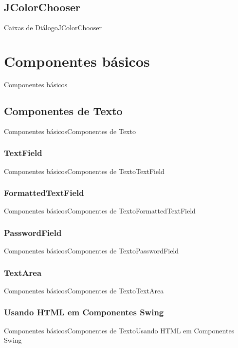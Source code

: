 \documentclass[10pt]{beamer}
\begin{document}
\subsection{JColorChooser}
\begin{frame}{Caixas de Diálogo}{JColorChooser}
\end{frame}{}
\section{Componentes básicos}
\begin{frame}{Componentes básicos}{}
\end{frame}{}
\subsection{Componentes de Texto}
\begin{frame}{Componentes básicos}{Componentes de Texto}
\end{frame}{}
\subsubsection{TextField}
\begin{frame}{Componentes básicos}{Componentes de Texto}{TextField}
\end{frame}{}
\subsubsection{FormattedTextField}
\begin{frame}{Componentes básicos}{Componentes de Texto}{FormattedTextField}
\end{frame}{}
\subsubsection{PasswordField}
\begin{frame}{Componentes básicos}{Componentes de Texto}{PasswordField}
\end{frame}{}
\subsubsection{TextArea}
\begin{frame}{Componentes básicos}{Componentes de Texto}{TextArea}
\end{frame}{}
\subsubsection{Usando HTML em Componentes Swing}
\begin{frame}{Componentes básicos}{Componentes de Texto}{Usando HTML em Componentes Swing}
\end{frame}{}
\end{document}
